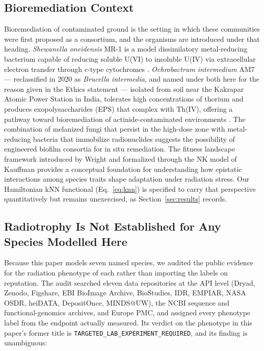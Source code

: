 \documentclass[11pt]{article}
\begin{document}
\subsection{Bioremediation Context}

Bioremediation of contaminated ground is the setting in which these communities were first proposed as a consortium, and the organisms are introduced under that heading.
\textit{Shewanella oneidensis} MR-1 is a model dissimilatory metal-reducing bacterium capable
of reducing soluble U(VI) to insoluble U(IV) via extracellular electron transfer through
c-type cytochromes \cite{heidelberg2002,veeramani2011}. \textit{Ochrobactrum intermedium} AM7
--- reclassified in 2020 as \textit{Brucella intermedia}, and named under both here for the
reason given in the Ethics statement ---
isolated from soil near the Kakrapar Atomic Power Station in India, tolerates high concentrations
of thorium and produces exopolysaccharides (EPS) that complex with Th(IV), offering a pathway
toward bioremediation of actinide-contaminated environments \cite{shukla2020}. The combination
of melanized fungi that persist in the high-dose zone with metal-reducing bacteria that
immobilize radionuclides suggests the possibility of engineered biofilm consortia for in situ
remediation. The fitness landscape framework introduced by Wright \cite{wright1932} and
formalized through the NK model of Kauffman \cite{kauffman1989} provides a conceptual foundation
for understanding how epistatic interactions among species traits shape adaptation under
radiation stress. Our Hamiltonian kNN functional (Eq.~\ref{eq:knn}) is specified to carry
that perspective quantitatively but remains unexercised, as Section~\ref{sec:results} records.

\subsection{Radiotrophy Is Not Established for Any Species Modelled Here}
\label{sec:radiotrophy_summary}

Because this paper models seven named species, we audited the public evidence for the radiation
phenotype of each rather than importing the labels on reputation. The audit
\cite{audit2026} searched eleven data repositories at the API level (Dryad, Zenodo, Figshare, EBI
BioImage Archive, BioStudies, IDR, EMPIAR, NASA OSDR, heiDATA, DepositOnce, MINDS@UW), the NCBI
sequence and functional-genomics archives, and Europe PMC, and assigned every phenotype label from
the endpoint actually measured. Its verdict on the phenotype in this paper's former title is
\texttt{TARGETED\_LAB\_EXPERIMENT\_REQUIRED}, and its finding is unambiguous:
\end{document}
